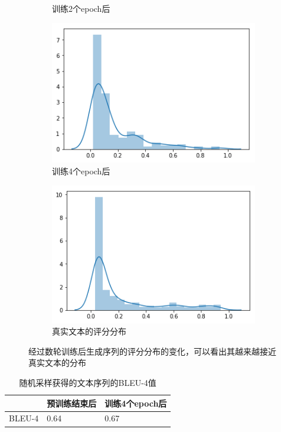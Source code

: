 \begin{figure}[htb]
\begin{subfigure}{.4\textwidth}
		\caption{训练2个epoch后}
    \end{subfigure}
    \begin{subfigure}{.4\textwidth}
		\includegraphics[width=\textwidth]{5.png}
		\caption{训练4个epoch后}
    \end{subfigure}
    \begin{subfigure}{.4\textwidth}
		\includegraphics[width=\textwidth]{raw.png}
		\caption{真实文本的评分分布}
	\end{subfigure}
    \caption{经过数轮训练后生成序列的评分分布的变化，可以看出其越来越接近真实文本的分布}
    \label{f3-1}
\end{figure}

\begin{table}[htb]
    \center
    \caption{\label{t3-5}随机采样获得的文本序列的BLEU-4值}
    \begin{tabular*}{\linewidth}{p{.33\linewidth}p{.33\linewidth}p{.33\linewidth}}
\toprule
&预训练结束后&训练4个epoch后\\
\midrule
BLEU-4&0.64&0.67\\
\bottomrule
    \end{tabular*}
\end{table}

